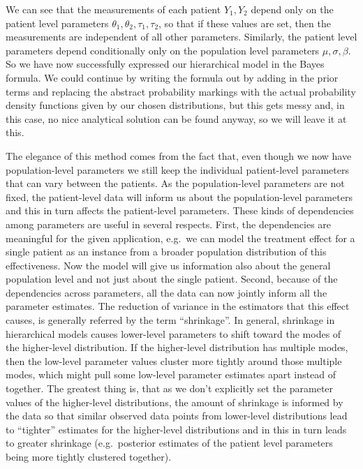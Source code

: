 \documentclass[12pt,a4paper,leqno]{report}
\theoremstyle{plain}
\theoremstyle{definition}
\theoremstyle{remark}
\begin{document}
We can see that the measurements of each patient \(Y_1, Y_2\) depend only on the patient
level parameters \(\theta_1, \theta_2, \tau_1, \tau_2\), so that if these values are set, then the
measurements are independent of all other parameters. Similarly, the patient level parameters depend conditionally only
on the population level parameters \(\mu, \sigma, \beta \). So we have now successfully
expressed our hierarchical model in the Bayes formula. We could continue by writing the
formula out by adding in the prior terms and replacing the abstract probability
markings with the actual probability density functions given by our chosen
distributions, but this gets messy and, in this case, no nice analytical solution can be
found anyway, so we will leave it at this.

The elegance of this method comes from the fact that, even though we now have
population-level parameters we still keep the individual patient-level parameters that can vary
between the patients. As the population-level parameters are not fixed, the
patient-level data will inform us about the population-level parameters and this in turn affects the patient-level parameters. These kinds of
dependencies among parameters are useful in several respects.
First, the dependencies are meaningful for the given application, e.g.\ we can
model the treatment effect for a single patient as an instance from a
broader population distribution of this effectiveness. Now the model will give us
information also about the general population level and not just about the single
patient. Second, because of the dependencies across parameters, all the data can now jointly inform all the
parameter estimates. The reduction of variance in the estimators that this
effect causes, is generally referred by the term ``shrinkage''. In general,
shrinkage in hierarchical models causes lower-level parameters to
shift toward the modes of the higher-level distribution. If the higher-level
distribution has multiple modes, then the low-level parameter values cluster
more tightly around those multiple modes, which might pull some
low-level parameter estimates apart instead of together. The greatest thing
is, that as we don't explicitly set the parameter values of the higher-level
distributions, the amount of shrinkage is informed by the data so that
similar observed data points from lower-level distributions lead to ``tighter''
estimates for the higher-level distributions and in this in turn leads to
greater shrinkage (e.g.\ posterior estimates of the patient level parameters being more
tightly clustered together).
\end{document}
